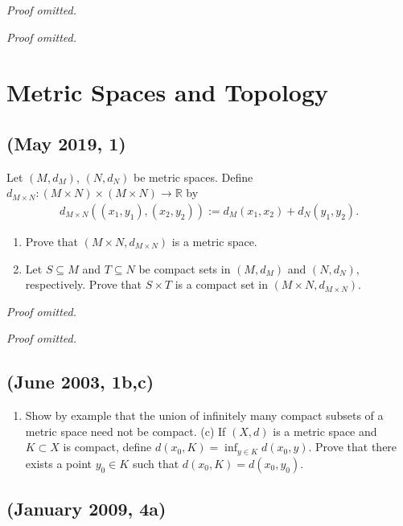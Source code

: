 \emph{Proof omitted.}

\emph{Proof omitted.}

\hypertarget{metric-spaces-and-topology}{%
\section{Metric Spaces and Topology}\label{metric-spaces-and-topology}}

\hypertarget{may-2019-1}{%
\subsection{(May 2019, 1)}\label{may-2019-1}}

Let \((M, d_M)\), \((N, d_N)\) be metric spaces. Define
\(d_{M \times N} \colon (M \times N) \times (M \times N) \to \mathbb{R}\)
by
\begin{align*}d_{M \times N}((x_1, y_1), (x_2, y_2)) := d_M(x_1, x_2) + d_N(y_1, y_2).\end{align*}

\begin{enumerate}
\def\labelenumi{\arabic{enumi}.}
\item
  Prove that \((M \times N, d_{M \times N})\) is a metric space.
\item
  Let \(S \subseteq M\) and \(T \subseteq N\) be compact sets in
  \((M, d_M)\) and \((N, d_N)\), respectively. Prove that \(S \times T\)
  is a compact set in \((M \times N, d_{M \times N})\).
\end{enumerate}

\emph{Proof omitted.}

\emph{Proof omitted.}

\hypertarget{june-2003-1bc}{%
\subsection{(June 2003, 1b,c)}\label{june-2003-1bc}}

\begin{enumerate}
\def\labelenumi{(\alph{enumi})}
\setcounter{enumi}{1}
\tightlist
\item
  Show by example that the union of infinitely many compact subsets of a
  metric space need not be compact. (c) If \((X,d)\) is a metric space
  and \(K\subset X\) is compact, define
  \(d(x_0,K)=\inf_{y\in K} d(x_0,y)\). Prove that there exists a point
  \(y_0\in K\) such that \(d(x_0,K)=d(x_0,y_0)\).
\end{enumerate}

\hypertarget{january-2009-4a}{%
\subsection{(January 2009, 4a)}\label{january-2009-4a}}

